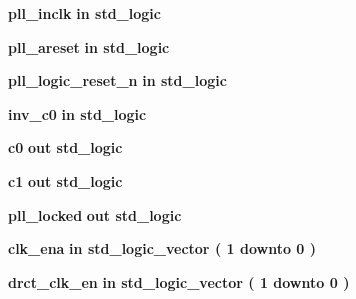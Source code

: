  \begin{DoxyCompactItemize}
\item 
{\bf pll\+\_\+inclk}  {\bfseries {\bfseries \textcolor{keywordflow}{in}\textcolor{vhdlchar}{ }}} {\bfseries \textcolor{comment}{std\+\_\+logic}\textcolor{vhdlchar}{ }} 
\item 
{\bf pll\+\_\+areset}  {\bfseries {\bfseries \textcolor{keywordflow}{in}\textcolor{vhdlchar}{ }}} {\bfseries \textcolor{comment}{std\+\_\+logic}\textcolor{vhdlchar}{ }} 
\item 
{\bf pll\+\_\+logic\+\_\+reset\+\_\+n}  {\bfseries {\bfseries \textcolor{keywordflow}{in}\textcolor{vhdlchar}{ }}} {\bfseries \textcolor{comment}{std\+\_\+logic}\textcolor{vhdlchar}{ }} 
\item 
{\bf inv\+\_\+c0}  {\bfseries {\bfseries \textcolor{keywordflow}{in}\textcolor{vhdlchar}{ }}} {\bfseries \textcolor{comment}{std\+\_\+logic}\textcolor{vhdlchar}{ }} 
\item 
{\bf c0}  {\bfseries {\bfseries \textcolor{keywordflow}{out}\textcolor{vhdlchar}{ }}} {\bfseries \textcolor{comment}{std\+\_\+logic}\textcolor{vhdlchar}{ }} 
\item 
{\bf c1}  {\bfseries {\bfseries \textcolor{keywordflow}{out}\textcolor{vhdlchar}{ }}} {\bfseries \textcolor{comment}{std\+\_\+logic}\textcolor{vhdlchar}{ }} 
\item 
{\bf pll\+\_\+locked}  {\bfseries {\bfseries \textcolor{keywordflow}{out}\textcolor{vhdlchar}{ }}} {\bfseries \textcolor{comment}{std\+\_\+logic}\textcolor{vhdlchar}{ }} 
\item 
{\bf clk\+\_\+ena}  {\bfseries {\bfseries \textcolor{keywordflow}{in}\textcolor{vhdlchar}{ }}} {\bfseries \textcolor{comment}{std\+\_\+logic\+\_\+vector}\textcolor{vhdlchar}{ }\textcolor{vhdlchar}{(}\textcolor{vhdlchar}{ }\textcolor{vhdlchar}{ } \textcolor{vhdldigit}{1} \textcolor{vhdlchar}{ }\textcolor{keywordflow}{downto}\textcolor{vhdlchar}{ }\textcolor{vhdlchar}{ } \textcolor{vhdldigit}{0} \textcolor{vhdlchar}{ }\textcolor{vhdlchar}{)}\textcolor{vhdlchar}{ }} 
\item 
{\bf drct\+\_\+clk\+\_\+en}  {\bfseries {\bfseries \textcolor{keywordflow}{in}\textcolor{vhdlchar}{ }}} {\bfseries \textcolor{comment}{std\+\_\+logic\+\_\+vector}\textcolor{vhdlchar}{ }\textcolor{vhdlchar}{(}\textcolor{vhdlchar}{ }\textcolor{vhdlchar}{ } \textcolor{vhdldigit}{1} \textcolor{vhdlchar}{ }\textcolor{keywordflow}{downto}\textcolor{vhdlchar}{ }\textcolor{vhdlchar}{ } \textcolor{vhdldigit}{0} \textcolor{vhdlchar}{ }\textcolor{vhdlchar}{)}\textcolor{vhdlchar}{ }} 

\end{DoxyCompactItemize}

